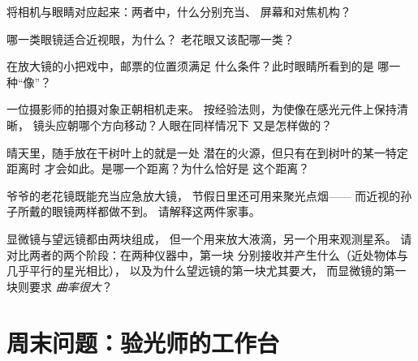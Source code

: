 \begin{exercise}[$\star$]\label{exo:g8:lenses-images:6}
将相机与眼睛对应起来：两者中，什么分别充当、
屏幕和对焦机构？
\end{exercise}

\begin{exercise}[$\star$]\label{exo:g8:lenses-images:7}
哪一类眼镜适合近视眼，为什么？
老花眼又该配哪一类？
\end{exercise}

\begin{exercise}[$\star$]\label{exo:g8:lenses-images:8}
在放大镜的小把戏中，邮票的位置须满足
什么条件？此时眼睛所看到的是
哪一种“像”？
\end{exercise}

\begin{exercise}[$\star\star$]\label{exo:g8:lenses-images:9}
一位摄影师的拍摄对象正朝相机走来。
按经验法则，为使像在感光元件上保持清晰，
镜头应朝哪个方向移动？人眼在同样情况下
又是怎样做的？
\end{exercise}

\begin{exercise}[$\star\star$]\label{exo:g8:lenses-images:10}
晴天里，随手放在干树叶上的就是一处
潜在的火源，但只有在到树叶的某一特定距离时
才会如此。是哪一个距离？为什么恰好是
这个距离？
\end{exercise}

\begin{exercise}[$\star\star$]\label{exo:g8:lenses-images:11}
爷爷的老花镜既能充当应急放大镜，
节假日里还可用来聚光点烟——
而近视的孙子所戴的眼镜两样都做不到。
请解释这两件家事。
\end{exercise}

\begin{exercise}[$\star\star\star$]\label{exo:g8:lenses-images:12}
显微镜与望远镜都由两块组成，
但一个用来放大液滴，另一个用来观测星系。
请对比两者的两个阶段：在两种仪器中，第一块
分别接收并产生什么（近处物体与几乎平行的星光相比），
以及为什么望远镜的第一块尤其要\emph{大}，
而显微镜的第一块则要求
\emph{曲率很大}？
\end{exercise}

\section{周末问题：验光师的工作台}


